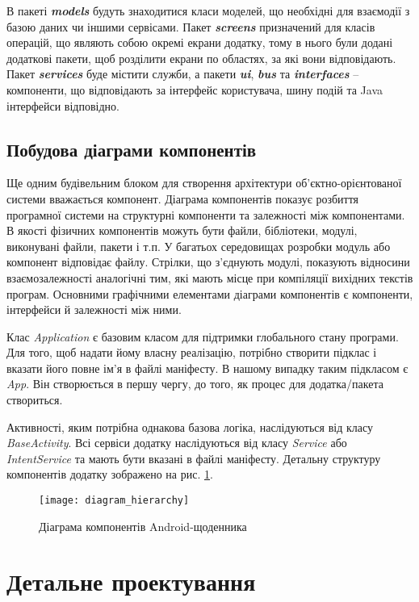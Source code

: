 \documentclass[../main.tex]{subfiles}
\begin{document}
В пакеті \textit{\textbf{models}} будуть знаходитися класи моделей, що необхідні для взаємодії з базою даних чи іншими сервісами. Пакет \textit{\textbf{screens}} призначений для класів операцій, що являють собою окремі екрани додатку, тому в нього були додані додаткові пакети, щоб розділити екрани по областях, за які вони відповідають. Пакет \textit{\textbf{services}} буде містити служби, а пакети \textit{\textbf{ui}}, \textit{\textbf{bus}} та \textit{\textbf{interfaces}} -- компоненти, що відповідають за інтерфейс користувача, шину подій та Java інтерфейси відповідно. 

\subsection{Побудова діаграми компонентів}
Ще одним будівельним блоком для створення архітектури об'єктно-орієнтованої системи вважається компонент. Діаграма компонентів показує розбиття програмної системи на структурні компоненти та залежності між компонентами. В якості фізичних компонентів можуть бути файли, бібліотеки, модулі, виконувані файли, пакети і т.п. У багатьох середовищах розробки модуль або компонент відповідає файлу. Стрілки, що з'єднують модулі, показують відносини взаємозалежності аналогічні тим, які мають місце при компіляції вихідних текстів програм. Основними графічними елементами діаграми компонентів є компоненти, інтерфейси й залежності між ними. 

Клас \textit{Application} є базовим класом для підтримки глобального стану програми. Для того, щоб надати йому власну реалізацію, потрібно створити підклас і вказати його повне ім'я в файлі маніфесту. В нашому випадку таким підкласом є \textit{App}. Він створюється в першу чергу, до того, як процес для додатка/пакета створиться.

Активності, яким потрібна однакова базова логіка, наслідуються від класу \textit{BaseActivity}. Всі сервіси додатку наслідуються від класу \textit{Service} або \textit{IntentService} та мають бути вказані в файлі маніфесту. Детальну структуру компонентів додатку зображено на рис. \ref{diagram:hierarchy}.

\begin{figure}[H]
	\centering
	\texttt{[image: diagram\_hierarchy]}
	\caption{Діаграма компонентів Android-щоденника}
	\label{diagram:hierarchy}
\end{figure}

\section{Детальне проектування}
\end{document}
